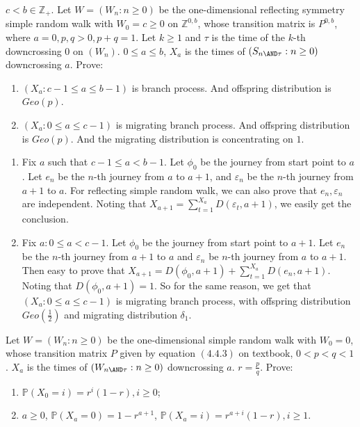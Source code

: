 \documentclass{ctexart}
\begin{document}
\begin{problem}\label{pro:2}
  \(c < b \in \mathbb{Z}_+\). Let \(W=(W_n :n \geq 0)\) be the one-dimensional reflecting symmetry simple
  random walk with \(W_0=c \geq 0\) on \(\mathbb{Z}^{0,b}\), whose transition matrix is \(P^{0,b}\), where
  \(a = 0,p,q >0, p + q =1\).
  Let \(k \geq 1\) and \(\tau\) is the time of the \(k\)-th downcrossing \(0\) on \((W_n)\).
  \(0 \leq a \leq b\),
  \(X_a\) is the times of \((S_{n \AND \tau}:n \geq 0)\) downcrossing \(a\). Prove:
  \begin{enumerate}
    \item \((X_a:c-1 \leq a \leq b-1)\) is branch process.
      And offspring distribution is \(Geo(p)\).
    \item \((X_a:0 \leq a \leq c-1)\) is migrating branch process.
      And offspring distribution is \(Geo(p)\).
      And the migrating distribution is concentrating on \(1\).
  \end{enumerate}
\end{problem}
\begin{solution}
  \begin{enumerate}
    \item Fix \(a\) such that \(c-1 \leq a < b-1\).
      Let \(\phi_0\) be the journey from start point to \(a\).
      Let \(e_n\) be the \(n\)-th journey from \(a\) to \(a+1\), and \(\varepsilon_n\) be the \(n\)-th journey from \(a+1\) to \(a\).
      For reflecting simple random walk, we can also prove that \(e_n,\varepsilon_n\) are independent.
      Noting that \(X_{a+1}=\sum_{t=1}^{X_a} D(\varepsilon_t,a+1)\), we easily get the conclusion.
    \item Fix \(a:0 \leq a<c-1\). Let \(\phi_0\) be the journey from start point to \(a+1\).
      Let \(e_n\) be the \(n\)-th journey from \(a+1\) to \(a\) and \(\varepsilon_n\) be \(n\)-th journey from \(a\) to \(a+1\).
      Then easy to prove that \(X_{a+1}=D(\phi_0,a+1)+\sum_{t=1}^{X_a} D(e_n,a+1)\).
      Noting that \(D(\phi_0,a+1)=1\). So for the same reason, we get that \((X_a:0 \leq a \leq c-1)\) is migrating branch process,
      with offspring distribution \(Geo(\frac{1}{2})\) and migrating distribution \(\delta_1\).
  \end{enumerate}

\end{solution}
\begin{problem}\label{pro:3}
  Let \(W=(W_n:n \geq 0)\) be the one-dimensional simple random walk with \(W_0=0\), whose transition matrix \(P\) given by equation \((4.4.3)\)
  on textbook, \(0< p<q<1\).
  \(X_a\) is the times of \((W_{n \AND \tau}:n \geq 0)\) downcrossing \(a\).
  \(r=\frac{p}{q}\).
  Prove:
  \begin{enumerate}
    \item \label{ite:3.1} \(\mathbb{P}(X_0=i)=r^i(1-r),i \geq 0\);
    \item \(a \geq 0\), \(\mathbb{P}(X_a=0)=1-r^{a +1}\), \(\mathbb{P}(X_a=i)=r^{a + i}(1 -r),i \geq 1\).
  \end{enumerate}
\end{problem}
\end{document}
